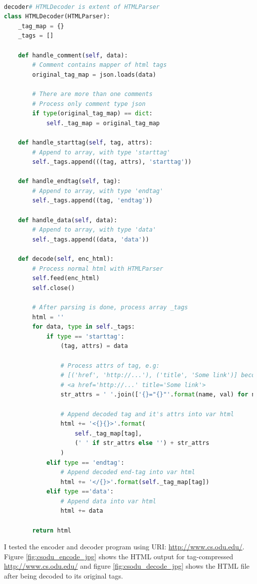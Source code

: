 \documentclass[letterpaper,11pt]{article}
\begin{document}
\begin{lstlisting}[language=python, caption={Decoder for HTML-tag Compressing }, label={lst:tag-compressing-decoder}]

decoder# HTMLDecoder is extent of HTMLParser
class HTMLDecoder(HTMLParser):
    _tag_map = {}
    _tags = []

    def handle_comment(self, data):
        # Comment contains mapper of html tags
        original_tag_map = json.loads(data)

        # There are more than one comments
        # Process only comment type json
        if type(original_tag_map) == dict:
            self._tag_map = original_tag_map

    def handle_starttag(self, tag, attrs):
        # Append to array, with type 'starttag'
        self._tags.append(((tag, attrs), 'starttag'))

    def handle_endtag(self, tag):
        # Append to array, with type 'endtag'
        self._tags.append((tag, 'endtag'))

    def handle_data(self, data):
        # Append to array, with type 'data'
        self._tags.append((data, 'data'))

    def decode(self, enc_html):
        # Process normal html with HTMLParser
        self.feed(enc_html)
        self.close()

        # After parsing is done, process array _tags
        html = ''
        for data, type in self._tags:
            if type == 'starttag':
                (tag, attrs) = data

                # Process attrs of tag, e.g:
                # [('href', 'http://...'), ('title', 'Some link')] become
                # <a href='http://...' title='Some link'>
                str_attrs = ' '.join(['{}="{}"'.format(name, val) for name, val in attrs])

                # Append decoded tag and it's attrs into var html
                html += '<{}{}>'.format(
                    self._tag_map[tag],
                    (' ' if str_attrs else '') + str_attrs
                )
            elif type == 'endtag':
                # Append decoded end-tag into var html
                html += '</{}>'.format(self._tag_map[tag])
            elif type =='data':
                # Append data into var html
                html += data

        return html
\end{lstlisting}

I tested the encoder and decoder program using URI: \url{http://www.cs.odu.edu/}. Figure \ref{fig:csodu_encode_jpg} shows the HTML output for tag-compressed \url{http://www.cs.odu.edu/} and figure \ref{fig:csodu_decode_jpg} shows the HTML file after being decoded to its original tags. 
\end{document}
